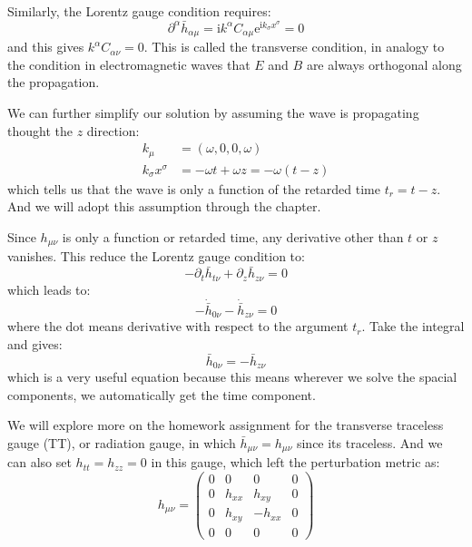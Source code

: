 \documentclass[10pt]{article}
\begin{document}
Similarly, the Lorentz gauge condition requires:
\begin{equation}\label{transverse_condition}
\partial^\alpha \bar{h}_{\alpha\mu}=\mathrm{i} k^\alpha C_{\alpha\mu} \mathrm{e}^{\mathrm{i} k_\sigma x^\sigma}=0
\end{equation}
and this gives $ k^\alpha C_{\alpha \nu}=0 $. This is called the transverse condition, in analogy to the condition in electromagnetic waves that $ E $ and $ B $ are always orthogonal along the propagation.

We can further simplify our solution by assuming the wave is propagating thought the $ z $ direction:
\begin{equation}\label{eq: z_direction}
\begin{aligned}
k_\mu&=(\omega,0,0,\omega)\\
k_\sigma x^\sigma&=-\omega t+\omega z=-\omega(t-z)
\end{aligned}
\end{equation}
which tells us that the wave is only a function of the retarded time $ t_r=t-z $. And we will adopt this assumption through the chapter.

Since $ h_{\mu\nu} $ is only a function or retarded time, any derivative other than $ t $ or $ z $ vanishes. This reduce the Lorentz gauge condition to:
\begin{equation}\label{eq: Lorentz_gauge_condition_1}
-\partial_t \bar{h}_{t \nu}+\partial_z \bar{h}_{z \nu}=0
\end{equation}
which leads to:
\begin{equation}\label{eq: Lorentz_gauge_condition_2}
-\dot{\bar{h}}_{0 \nu}-\dot{\bar{h}}_{z \nu}=0
\end{equation}
where the dot means derivative with respect to the argument $ t_r $. Take the integral and gives:
\begin{equation}\label{eq: Lorentz_gauge_condition_3}
\bar{h}_{0 \nu}=-\bar{h}_{z \nu}
\end{equation}
which is a very useful equation because this means wherever we solve the spacial components, we automatically get the time component. 

We will explore more on the homework assignment for the transverse traceless gauge (TT), or radiation gauge, in which $ \bar{h}_{\mu\nu}=h_{\mu\nu} $ since its traceless. And we can also set $ h_{tt}=h_{zz}=0 $ in this gauge, which left the perturbation metric as:
\begin{equation}\label{eq: metric_TT}
h_{\mu\nu}=
\begin{pmatrix}
0 & 0 & 0 & 0 \\ 
0 & h_{xx} & h_{xy} & 0 \\ 
0 & h_{xy} & -h_{xx} & 0 \\ 
0 & 0 & 0 & 0
\end{pmatrix}
\end{equation}
\end{document}
